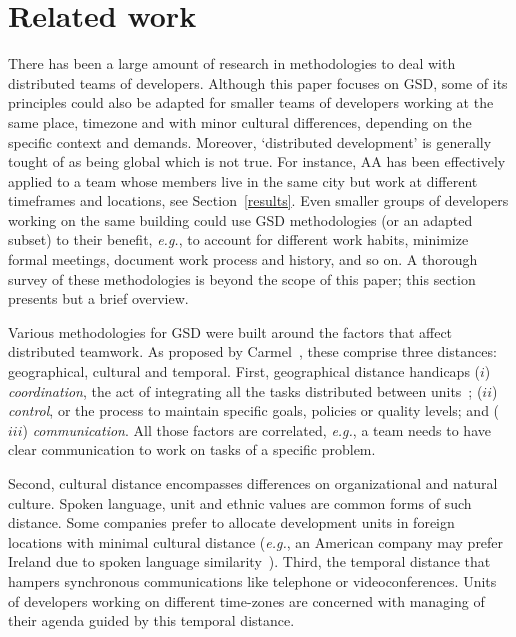 \documentclass{article}
\newcommand{\eg}{{\it e.g.}}
\newcommand{\indraftnote}[1]{}
\newcommand{\todo}[1]{\indraftnote{todo: #1}}
\begin{document}
\indraftnote{TODO: cite CIA.vc bot stuff}

\section{Related work}
\label{related-work}
\nocite{gobbo:APSEEP2008}
\nocite{Reis:PhDThesis:2003}



There has been a large amount of research in methodologies to deal with
distributed teams of developers. Although this paper focuses on GSD, some of
its principles could also be adapted for smaller teams of developers working at
the same place, timezone and with minor cultural differences, depending on the
specific context and demands.  Moreover, `distributed development' is generally
tought of as being global which is not true. For instance, AA has been
effectively applied to a team whose members live in the same city but work at
different timeframes and locations, see Section~\ref{results}.  Even smaller
groups of developers working on the same building could use GSD methodologies
(or an adapted subset) to their benefit, \eg, to account for different work
habits, minimize formal meetings, document work process and history, and so on.
A thorough survey of these methodologies is beyond the scope of this paper; this
section presents but a brief overview. 

Various methodologies for GSD were built around the factors that
affect distributed teamwork. As proposed by Carmel~\cite{carmel1999}, these
comprise three distances: geographical, cultural and temporal. 
First, geographical distance handicaps ($i$) \emph{coordination}, the act of
integrating all the tasks distributed between units~\cite{carmel2001}; ($ii$)
\emph{control}, or the process to maintain specific goals, policies or quality
levels; and ($iii$) \emph{communication}. All those factors are correlated, \eg,
a team needs to have clear communication to work on tasks of a specific problem.  

Second, cultural distance encompasses differences on organizational and
natural culture. Spoken language, unit and ethnic values are common
forms of such distance. Some companies prefer to allocate development
units in foreign locations with minimal cultural distance (\eg, an
American company may prefer Ireland due to spoken language
similarity~\cite{carmel2001}). Third, the temporal distance that
hampers synchronous communications like telephone or
videoconferences. Units of developers working on different time-zones
are concerned with managing of their agenda guided by this temporal
distance.
\end{document}

